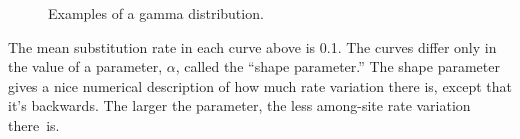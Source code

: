 \begin{figure}
\begin{center}
\end{center}
\caption{Examples of a gamma distribution.}\label{fig:asrv}
\end{figure}

The mean substitution rate in each curve above is 0.1. The curves
differ only in the value of a parameter, $\alpha$, called the ``shape
parameter.'' The shape parameter gives a nice numerical description of
how much rate variation there is, except that it's backwards. The
larger the parameter, the less among-site rate variation
there~is.

